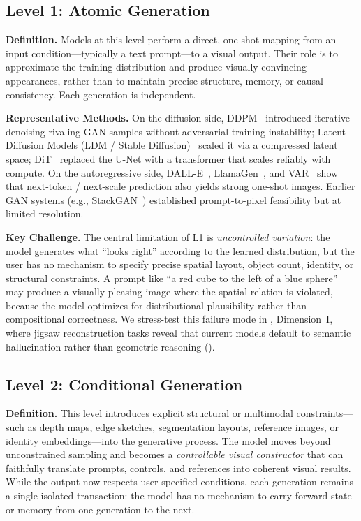 \subsection{Level 1: Atomic Generation}
\label{subsec:level1}

\textbf{Definition.} Models at this level perform a direct, one-shot mapping from an input condition---typically a text prompt---to a visual output. Their role is to approximate the training distribution and produce visually convincing appearances, rather than to maintain precise structure, memory, or causal consistency. Each generation is independent.

\textbf{Representative Methods.} On the diffusion side, DDPM~\citep{ho2020denoising} introduced iterative denoising rivaling GAN samples without adversarial-training instability; Latent Diffusion Models (LDM / Stable Diffusion)~\citep{rombach2022stablediffusion} scaled it via a compressed latent space; DiT~\citep{peebles2023scalable} replaced the U-Net with a transformer that scales reliably with compute. On the autoregressive side, DALL-E~\citep{ramesh2021zero}, LlamaGen~\citep{sun2024autoregressive}, and VAR~\citep{tian2024visual} show that next-token / next-scale prediction also yields strong one-shot images. Earlier GAN systems (e.g., StackGAN~\citep{zhang2017stackgan}) established prompt-to-pixel feasibility but at limited resolution.

\textbf{Key Challenge.} The central limitation of L1 is \emph{uncontrolled variation}: the model generates what ``looks right'' according to the learned distribution, but the user has no mechanism to specify precise spatial layout, object count, identity, or structural constraints. A prompt like ``a red cube to the left of a blue sphere'' may produce a visually pleasing image where the spatial relation is violated, because the model optimizes for distributional plausibility rather than compositional correctness. We stress-test this failure mode in , Dimension~I, where jigsaw reconstruction tasks reveal that current models default to semantic hallucination rather than geometric reasoning ().


\subsection{Level 2: Conditional Generation}
\label{subsec:level2}

\textbf{Definition.} This level introduces explicit structural or multimodal constraints---such as depth maps, edge sketches, segmentation layouts, reference images, or identity embeddings---into the generative process. The model moves beyond unconstrained sampling and becomes a \emph{controllable visual constructor} that can faithfully translate prompts, controls, and references into coherent visual results. While the output now respects user-specified conditions, each generation remains a single isolated transaction: the model has no mechanism to carry forward state or memory from one generation to the next.

